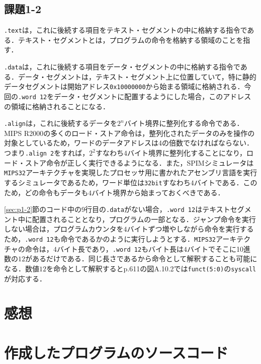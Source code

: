 \subsection{課題1-2}
\verb|.text|は，これに後続する項目をテキスト・セグメントの中に格納する指令である\cite{book:assembly}．テキスト・セグメントとは，プログラムの命令を格納する領域のことを指す．

\verb|.data|は，これに後続する項目をデータ・セグメントの中に格納する指令である\cite{book:assembly}．データ・セグメントは，テキスト・セグメント上に位置していて，特に静的データセグメントは開始アドレス\verb|0x10000000|から始まる領域に格納される．今回の\verb|.word 12|をデータ・セグメントに配置するようにした場合，このアドレスの領域に格納されることになる．

\verb|.align|は，これに後続するデータを$2^n$バイト境界に整列化する命令である\cite{book:assembly}．MIPS R2000の多くのロード・ストア命令は，整列化されたデータのみを操作の対象としているため，ワードのデータアドレスは4の倍数でなければならない．つまり\verb|.align 2|をすれば，$2^2$すなわち$4$バイト境界に整列化することになり，ロード・ストア命令が正しく実行できるようになる．また，SPIMシミュレータは\verb|MIPS32|アーキテクチャを実現したプロセッサ用に書かれたアセンブリ言語を実行するシミュレータであるため，ワード単位は\verb|32bit|すなわち$4$バイトである．このため，どの命令もデータも$4$バイト境界から始まっておくべきである．

\ref{sec:p1-2}節のコード中の9行目の\verb|.data|がない場合，\verb|.word 12|はテキストセグメント中に配置されることとなり，プログラムの一部となる．ジャンプ命令を実行しない場合は，プログラムカウンタを$4$バイトずつ増やしながら命令を実行するため，\verb|.word 12|も命令であるかのように実行しようとする．\verb|MIPS32|アーキテクチャの命令は，$4$バイト長であり，\verb|.word 12|もバイト長は$4$バイトでそこに10進数の$12$があるだけである．同じ長さであるから命令として解釈することも可能になる．数値$12$を命令として解釈するとp.611の図A.10.2では\verb|funct(5:0)|の\verb|syscall|が対応する\cite{book:assembly}．

\section{感想}


\section{作成したプログラムのソースコード} \label{sec:makep}

